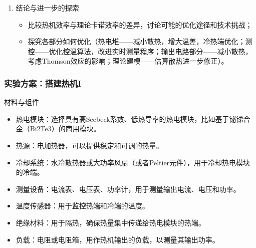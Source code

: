 \documentclass[aspectratio=169]{beamer}
\begin{document}
\begin{frame}[allowframebreaks]
\begin{enumerate}
			\item 结论与进一步的探索
			\begin{itemize}
				\item 比较热机效率与理论卡诺效率的差异，讨论可能的优化途径和技术挑战；
				\item 探究各部分如何\textcolor{c4}{优化}（热电堆——减小散热，增大温差，冷热端优化；测控——优化控温算法，改进实时测量程序；输出电路部分——减小散热，考虑Thomson效应的影响；理论建模——估算散热进一步修正）。
			\end{itemize}
		\end{enumerate}
		
		\begin{figure}[htbp]
			\centering
		\end{figure}
		
	\end{frame}
		
	\begin{frame}	
		\frametitle{实验方案：搭建热机I}
		
		\begin{block}{材料与组件}
			\begin{itemize}
				\small\item \textcolor{c4}{热电模块}：选择具有高Seebeck系数、低热导率的热电模块，比如基于铋锑合金（Bi2Te3）的商用模块。
				\item 热源：电加热器，可以提供稳定和可调的热量。
				\item \textcolor{c4}{冷却系统}：水冷散热器或大功率风扇（或者Peltier元件），用于冷却热电模块的冷端。
				\item 测量设备：电流表、电压表、功率计，用于测量输出电流、电压和功率。
				\item 温度传感器：用于监控热端和冷端的温度。
				\item 绝缘材料：用于隔热，确保热量集中传递给热电模块的热端。
				\item 负载：电阻或电阻箱，用作热机输出的负载，以测量其输出功率。
			\end{itemize}
		\end{block}
		
	\end{frame}
		
\end{document}
